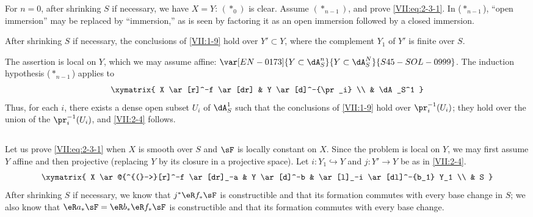 For $n=0$, after shrinking $S$ if necessary, we have $X=Y$: $(\ast_0)$ is
clear. Assume $(\ast_{n-1})$, and prove \eqref{VII:eq:2-3-1}. In
($\ast_{n-1}$), ``open immersion'' may be replaced by ``immersion,'' as is
seen by factoring it as an open immersion followed by a closed immersion.





\begin{lemma_}\label{VII:2-4}
After shrinking $S$ if necessary, the conclusions of \ref{VII:1-9} hold over
$Y'\subset Y$, where the complement $Y_1$ of $Y'$ is finite over $S$.
\end{lemma_}

The assertion is local on $Y$, which we may assume affine:
$\var[EN-0173]{Y\subset \dA_S^n}{Y\subset \dA_S^N}{S45-SOL-0999}$. The induction hypothesis ($\ast_{n-1}$) applies to
\[\xymatrix{
  X \ar[r]^-f \ar[dr] 
    & Y \ar[d]^-{\pr_i} \\
  & \dA_S^1 
}\]
Thus, for each $i$, there exists a dense open subset $U_i$ of $\dA_S^1$ such
that the conclusions of \ref{VII:1-9} hold over $\pr_i^{-1}(U_i)$; they hold
over the union of the $\pr_i^{-1}(U_i)$, and \ref{VII:2-4} follows.





\addtocounter{subsection}{1} %
\subsection{}\label{VII:2-6}

Let us prove \eqref{VII:eq:2-3-1} when $X$ is smooth over $S$ and $\sF$ is
locally constant on $X$. Since the problem is local on $Y$, we may first
assume $Y$ affine and then projective (replacing $Y$ by its closure in a
projective space). Let $i:Y_1\hookrightarrow Y$ and $j:Y' \to Y$ be as in
\ref{VII:2-4}.
\[\xymatrix{
  X \ar@{^{(}->}[r]^-f \ar[dr]_-a 
    & Y \ar[d]^-b 
    & \ar[l]_-i \ar[dl]^-{b_1} Y_1 \\
  & S 
}\] 
After shrinking $S$ if necessary, we know that $j^\ast \eR f_\ast \sF$ is
constructible and that its formation commutes with every base change in $S$;
we also know that $\eR a_\ast \sF = \eR b_\ast \eR f_\ast \sF$ is
constructible and that its formation commutes with every base change.

